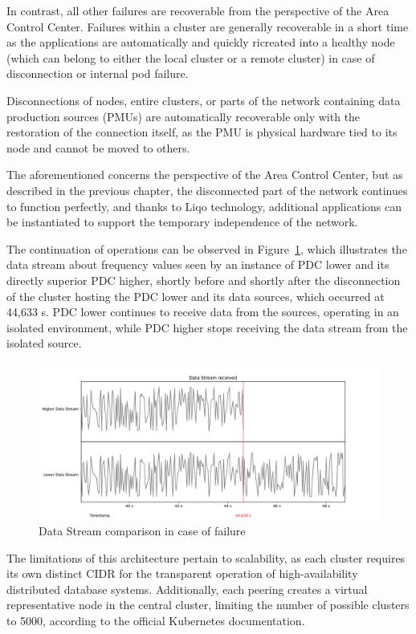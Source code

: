 In contrast, all other failures are recoverable from the perspective of the Area Control Center. Failures within a cluster are generally recoverable in a short time as the applications are automatically and quickly ricreated into a healthy node (which can belong to either the local cluster or a remote cluster) in case of disconnection or internal pod failure. 

Disconnections of nodes, entire clusters, or parts of the network containing data production sources (PMUs) are automatically recoverable only with the restoration of the connection itself, as the PMU is physical hardware tied to its node and cannot be moved to others.

The aforementioned concerns the perspective of the Area Control Center, but as described in the previous chapter, the disconnected part of the network continues to function perfectly, and thanks to Liqo technology, additional applications can be instantiated to support the temporary independence of the network.

The continuation of operations can be observed in Figure~\ref{fig:stream}, which illustrates the data stream about frequency values seen by an instance of PDC lower and its directly superior PDC higher, shortly before and shortly after the disconnection of the cluster hosting the PDC lower and its data sources, which occurred at 44,633 s. PDC lower continues to receive data from the sources, operating in an isolated environment, while PDC higher stops receiving the data stream from the isolated source. 

\begin{figure}[ht]\centering
\includegraphics[scale=0.5]{Pictures/data-stream}
\caption{Data Stream comparison in case of failure}\label{fig:stream}
\end{figure}

The limitations of this architecture pertain to scalability, as each cluster requires its own distinct CIDR for the transparent operation of high-availability distributed database systems. Additionally, each peering creates a virtual representative node in the central cluster, limiting the number of possible clusters to 5000, according to the official Kubernetes documentation.

